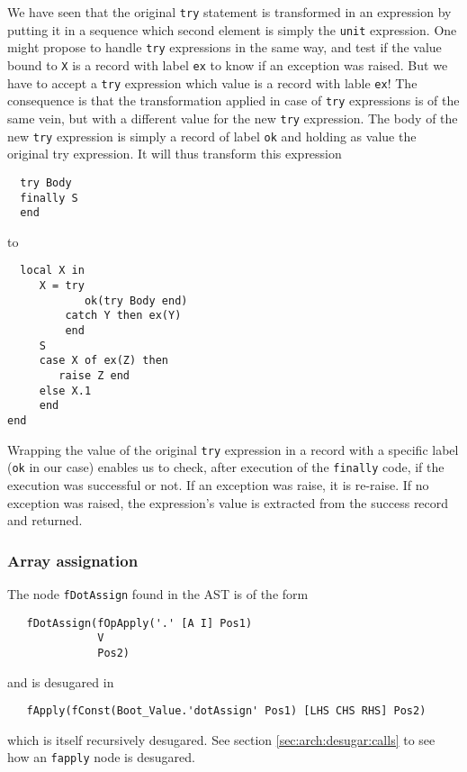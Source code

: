\documentclass[a4paper]{memoir}
\begin{document}

We have seen that the original \lstinline!try! statement is transformed in an
expression by putting it in a sequence which second element is simply the
\lstinline!unit! expression. One might propose to handle \lstinline!try!
expressions in the same way, and test if the value bound to \lstinline!X! is a
record with label \lstinline!ex! to know if an exception was raised. 
But we have to accept a \lstinline!try! expression which
value is a record with lable \lstinline!ex!! The consequence is that the
transformation applied in case of \lstinline!try! expressions is of the same
vein, but with a different value for the new \lstinline!try! expression.
The body of the new \lstinline!try! expression is simply a record of label
\lstinline!ok! and holding as value the original try expression.
It will thus transform this expression
\begin{lstlisting}
  try Body
  finally S 
  end
\end{lstlisting}

to

\begin{lstlisting}
  local X in 
     X = try 
            ok(try Body end)
         catch Y then ex(Y)
         end 
     S 
     case X of ex(Z) then 
        raise Z end 
     else X.1 
     end 
end  
\end{lstlisting}

Wrapping the value of the original \lstinline!try! expression in a record
with a specific label (\lstinline!ok! in our case) enables us to check, 
after execution of the \lstinline!finally! code, if the
execution was successful or not. If an exception was raise, it is re-raise. If
no exception was raised, the expression's value is extracted from the success
record and returned.



\subsubsection{Array assignation}\label{sec:arch:desugar:dotassign}
The node \lstinline!fDotAssign! found in the AST is of the form 
\begin{lstlisting}
   fDotAssign(fOpApply('.' [A I] Pos1) 
              V 
              Pos2) 
\end{lstlisting}
and is desugared in 
\begin{lstlisting}
   fApply(fConst(Boot_Value.'dotAssign' Pos1) [LHS CHS RHS] Pos2)
\end{lstlisting}
which is itself recursively desugared. See section \ref{sec:arch:desugar:calls}
to see how an \lstinline!fapply! node is desugared.
\end{document}
